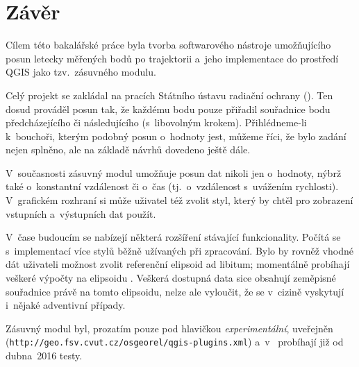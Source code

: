 \chapter{Závěr}
\label{zaver}

Cílem této bakalářské práce byla tvorba
softwarového nástroje umožňujícího posun letecky
měřených bodů po trajektorii a~jeho implementace
do prostředí QGIS jako tzv.~zásuvného modulu. 

Celý projekt se zakládal na pracích Státního
ústavu radiační ochrany (). Ten dosud prováděl posun
tak, že každému bodu pouze přiřadil souřadnice bodu
předcházejícího či následujícího (s~libovolným
krokem). Přihlédneme-li k~bouchoři, kterým podobný posun
o~hodnoty jest, můžeme říci, že bylo zadání
nejen splněno, ale na základě návrhů 
dovedeno ještě dále. 

V~současnosti zásuvný modul umožňuje posun dat
nikoli jen o~hodnoty, nýbrž také o~konstantní
vzdálenost či o~čas (tj.~o~vzdálenost
s~uvážením rychlosti). V~grafic\-kém
rozhraní si může uživatel též zvolit styl,
který by chtěl pro zobrazení vstupních
a~výstupních dat použít. 

V~čase budoucím se nabízejí některá rozšíření
stávající funkcionality. Počítá se s~implementací
více stylů běžně užívaných při zpracování. Bylo by
rovněž vhodné dát uživateli možnost zvolit
referenční elipsoid ad libitum; momentálně
probíhají veš\-keré výpočty na elipsoidu .
Veškerá dostupná data sice obsahují zeměpisné souřadnice
právě na tomto elipsoidu, nelze ale vyloučit, že
se v~cizině vyskytují i~nějaké adventivní případy.

Zásuvný modul byl, prozatím pouze pod hlavičkou \textit{experimentální},
uveřejněn ({\tt http://geo.fsv.cvut.cz/osgeorel/qgis-plugins.xml}) a~v~ probíhají již od dubna~2016 testy.


